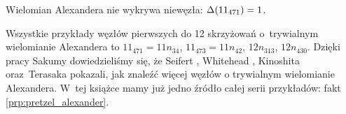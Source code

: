 \begin{example}
\label{alexander_no_detects_unknot}%
    Wielomian Alexandera nie wykrywa niewęzła:
    $\Delta(11_{471}) = 1$.
\end{example}

Wszystkie przykłady węzłów pierwszych do 12 skrzyżowań o~trywialnym wielomianie Alexandera to $11_{471} = 11n_{34}$, $11_{473} = 11n_{42}$, $12n_{313}$, $12n_{430}$.
Dzięki pracy Sakumy \cite{sakuma2020} dowiedzieliśmy się, że Seifert \cite{seifert1935}, Whitehead \cite{whitehead1937}, Kinoshita oraz~Terasaka \cite{kinoshita1957} pokazali, jak znaleźć więcej węzłów o trywialnym wielomianie Alexandera.
%
%
%
%
%
W~tej książce mamy już jedno źródło całej serii przykładów: fakt \ref{prp:pretzel_alexander}.

